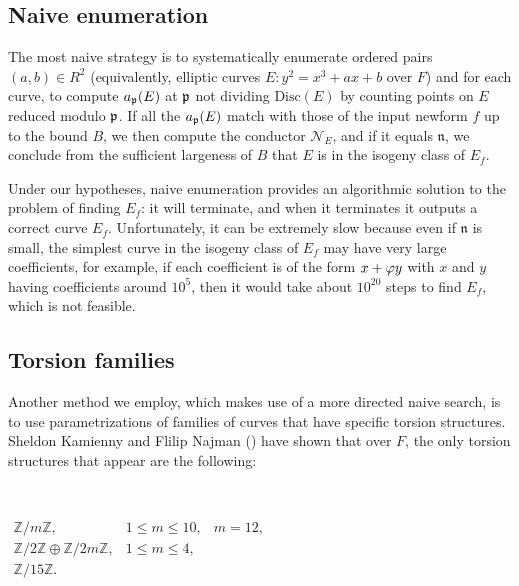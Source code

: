 \documentclass{amsart}
\newcommand{\n}{\mathfrak{n}}
\newcommand{\cN}{\mathcal{N}}
\begin{document}
\subsection{Naive enumeration}\label{sec:naive}

The most naive strategy is to systematically enumerate ordered pairs $(a,b) \in
R^2$ (equivalently, elliptic curves $E:  y^2 = x^3 + ax + b$ over $F$) and for
each curve, to compute $a_{\mathfrak{p}}(E)$ at $\mathfrak{p}$ not dividing $\text{Disc}(E)$ by counting points
on $E$ reduced modulo $\mathfrak{p}$.  If all the $a_{\mathfrak{p}}(E)$ match with those of the input newform
$f$ up to the bound $B$, we then compute the conductor $\cN_E$, and
if it equals $\n$, we conclude from the sufficient largeness of $B$ that $E$ is in the isogeny class
of $E_f$.

Under our hypotheses, naive enumeration provides an algorithmic
solution to the problem of finding $E_f$: it will terminate, and when
it terminates it outputs a correct curve $E_f$. Unfortunately, it can
be extremely slow because even if $\n$ is small, the simplest curve in the
isogeny class of $E_f$ may have very large coefficients, for example,
if each coefficient is of the form $x+\varphi y$ with $x$ and $y$ having
coefficients around $10^5$, then it would take about $10^{20}$ steps
to find $E_f$, which is not feasible.

\subsection{Torsion families}\label{sec:torsion}

Another method we employ, which makes use of a more directed naive search, is to use parametrizations of families of curves that have specific torsion structures. Sheldon Kamienny and Flilip Najman (\cite{kamienny-najman}) have shown that over $F$, the only torsion structures that appear are the following:

\

$\begin{array}{lll}
\mathbb{Z}/m\mathbb{Z},   &1 \leq m \leq 10,& m = 12,\\
\mathbb{Z}/2\mathbb{Z} \oplus \mathbb{Z}/2m\mathbb{Z}, &  1 \leq m \leq 4,&\\
\mathbb{Z}/15\mathbb{Z}.&&
\end{array}$

\
\end{document}
